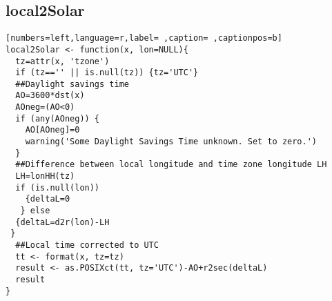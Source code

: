\subsection{local2Solar}
\label{sec:orgcabad87}
\begin{lstlisting}[numbers=left,language=r,label= ,caption= ,captionpos=b]
local2Solar <- function(x, lon=NULL){	
  tz=attr(x, 'tzone')
  if (tz=='' || is.null(tz)) {tz='UTC'}
  ##Daylight savings time
  AO=3600*dst(x)
  AOneg=(AO<0)
  if (any(AOneg)) {
    AO[AOneg]=0
    warning('Some Daylight Savings Time unknown. Set to zero.')
  }
  ##Difference between local longitude and time zone longitude LH
  LH=lonHH(tz)
  if (is.null(lon)) 
    {deltaL=0
   } else
  {deltaL=d2r(lon)-LH
 }
  ##Local time corrected to UTC
  tt <- format(x, tz=tz)
  result <- as.POSIXct(tt, tz='UTC')-AO+r2sec(deltaL)
  result
}
\end{lstlisting}
